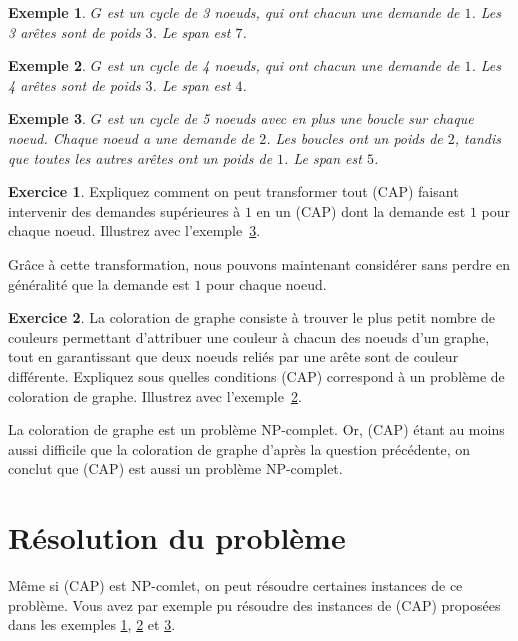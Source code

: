 \documentclass[a4paper,francais]{article}
\newtheorem{Exemple}{Exemple}
\theoremstyle{definition}
\newtheorem{exercice}{Exercice}[section]
\begin{document}
\begin{Exemple}
  \label{ex:triangle}
  $G$ est un cycle de 3 noeuds, qui ont chacun une demande de $1$.
  Les 3 arêtes sont de poids $3$. Le span est $7$.
\end{Exemple}

\begin{Exemple}
  \label{ex:carre}
  $G$ est un cycle de 4 noeuds, qui ont chacun une demande de $1$.
  Les 4 arêtes sont de poids $3$. Le span est $4$.
\end{Exemple}

\begin{Exemple}
  \label{ex:demande2}
  $G$ est un cycle de 5 noeuds avec en plus une boucle sur chaque noeud.
  Chaque noeud a une demande de $2$. Les boucles ont un poids de $2$,
  tandis que toutes les autres arêtes ont un poids de $1$. Le span est $5$. 
\end{Exemple}

\begin{exercice}
  Expliquez comment on peut transformer tout (CAP) faisant intervenir
  des demandes supérieures à $1$ en un (CAP) dont la demande est $1$
  pour chaque noeud. Illustrez avec l'exemple~\ref{ex:demande2}.
\end{exercice}

Grâce à cette transformation, nous pouvons maintenant considérer sans
perdre en généralité que la demande est $1$ pour chaque noeud.

\begin{exercice}
  La coloration de graphe consiste à trouver le plus petit nombre de
  couleurs permettant d'attribuer une couleur à chacun des noeuds
  d'un graphe, tout en garantissant que deux noeuds reliés par une
  arête sont de couleur différente.
  Expliquez sous quelles conditions (CAP) correspond à un problème
  de coloration de graphe. Illustrez avec l'exemple~\ref{ex:carre}. 
\end{exercice}

La coloration de graphe est un problème NP-complet. Or, (CAP) étant
au moins aussi difficile que la coloration de graphe d'après la
question précédente, on conclut que (CAP) est aussi un problème
NP-complet. 

\section{Résolution du problème}
\label{sec:resolution}

Même si (CAP) est NP-comlet, on peut résoudre certaines instances
de ce problème. Vous avez par exemple pu résoudre des instances de (CAP)
proposées dans les exemples \ref{ex:triangle}, \ref{ex:carre} et
\ref{ex:demande2}. 
\end{document}
